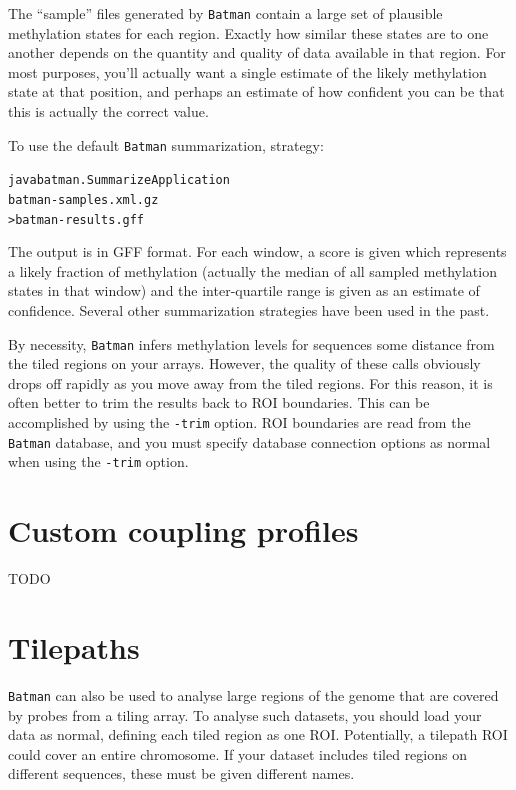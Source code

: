 \documentclass[a4paper, 11pt]{article}
\newcommand{\bm}{{\tt Batman}\xspace}
\begin{document}
The ``sample'' files generated by \bm contain a large set of plausible
methylation states for each region.  Exactly how similar these states
are to one another depends on the quantity and quality of data available
in that region.  For most purposes, you'll actually want a single estimate
of the likely methylation state at that position, and perhaps an estimate
of how confident you can be that this is actually the correct value.

To use the default \bm summarization, strategy:

\begin{alltt}java batman.SummarizeApplication 
    batman-samples.xml.gz
    >batman-results.gff\end{alltt}

The output is in GFF format.  For each window, a score is given which represents 
a likely fraction of methylation (actually the median of all sampled methylation
states in that window) and the inter-quartile range is given as an estimate of
confidence.  Several other summarization strategies have been used in the past.

By necessity, \bm infers methylation levels for sequences some distance from
the tiled regions on your arrays.  However, the quality of these calls obviously
drops off rapidly as you move away from the tiled regions.  For this reason, it
is often better to trim the results back to ROI boundaries.  This can be accomplished
by using the {\tt -trim} option.  ROI boundaries are read from the \bm database,
and you must specify database connection options as normal when using the {\tt -trim}
option.

\section{Custom coupling profiles}

TODO

\section{Tilepaths}

\bm can also be used to analyse large regions of the genome that are covered by probes
from a tiling array.  To analyse such datasets, you should load your data as normal, defining
each tiled region as one ROI.  Potentially, a tilepath ROI could cover an entire chromosome.
If your dataset includes tiled regions on different sequences, these must be given different
names.
\end{document}
